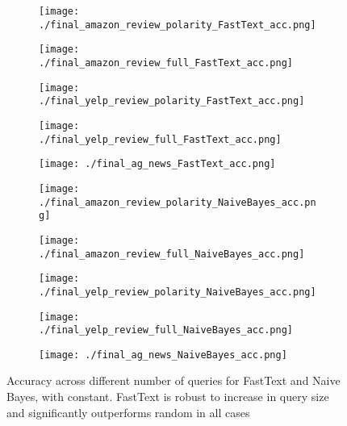 \documentclass[11pt,a4paper]{article}
\begin{document}
\begin{figure*}[h!]
\begin{subfigure}[h]{0.33\linewidth}
\texttt{[image: ./final\_amazon\_review\_polarity\_FastText\_acc.png]}
\end{subfigure}
\begin{subfigure}[h]{0.33\linewidth}
\texttt{[image: ./final\_amazon\_review\_full\_FastText\_acc.png]}
\end{subfigure}
\begin{subfigure}[h]{0.33\linewidth}
\texttt{[image: ./final\_yelp\_review\_polarity\_FastText\_acc.png]}
\end{subfigure}
\begin{subfigure}[h]{0.33\linewidth}
\texttt{[image: ./final\_yelp\_review\_full\_FastText\_acc.png]}
\end{subfigure}
\begin{subfigure}[h]{0.33\linewidth}
\texttt{[image: ./final\_ag\_news\_FastText\_acc.png]}
\end{subfigure}
\begin{subfigure}[h]{0.33\linewidth}
\texttt{[image: ./final\_amazon\_review\_polarity\_NaiveBayes\_acc.png]}
\end{subfigure}
\begin{subfigure}[h]{0.33\linewidth}
\texttt{[image: ./final\_amazon\_review\_full\_NaiveBayes\_acc.png]}
\end{subfigure}
\begin{subfigure}[h]{0.33\linewidth}
\texttt{[image: ./final\_yelp\_review\_polarity\_NaiveBayes\_acc.png]}
\end{subfigure}
\begin{subfigure}[h]{0.33\linewidth}
\texttt{[image: ./final\_yelp\_review\_full\_NaiveBayes\_acc.png]}
\end{subfigure}
\begin{subfigure}[h]{0.33\linewidth}
\texttt{[image: ./final\_ag\_news\_NaiveBayes\_acc.png]}
\end{subfigure}
\caption{Accuracy across different number of queries  for FastText and Naive Bayes, with   constant. FastText is robust to increase in query size and significantly outperforms random in all cases} 
\label{fig:all_accuracies}
\end{figure*}
\end{document}

